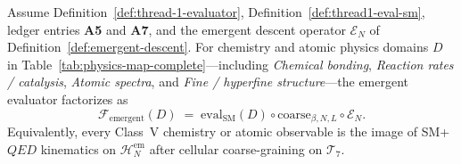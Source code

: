 \begin{theorem}\label{thm:thread-1-descent}
Assume Definition~\ref{def:thread-1-evaluator},
Definition~\ref{def:thread1-eval-sm}, ledger entries \textbf{A5} and
\textbf{A7}, and the emergent descent operator
$\mathcal{E}_N$ of Definition~\ref{def:emergent-descent}. For chemistry and
atomic physics domains $D$ in Table~\ref{tab:physics-map-complete}---including
\emph{Chemical bonding}, \emph{Reaction rates / catalysis},
\emph{Atomic spectra}, and \emph{Fine / hyperfine structure}---the emergent
evaluator factorizes as
\begin{equation}\label{eq:thread1-descent}
  \mathcal{F}_{\mathrm{emergent}}(D)
  \;=\;
  \mathrm{eval}_{\mathrm{SM}}(D)
  \circ
  \mathrm{coarse}_{\beta,N,L}
  \circ
  \mathcal{E}_N.
\end{equation}
Equivalently, every Class~V chemistry or atomic observable is the image of
SM+$QED$ kinematics on $\mathcal{H}_N^{\mathrm{em}}$ after cellular
coarse-graining on $\mathcal{T}_7$.
\end{theorem}

